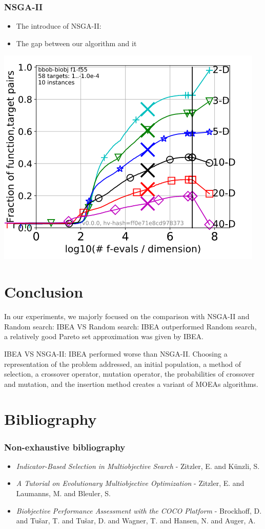 \documentclass{beamer}
\begin{document}
\begin{frame}
\frametitle{NSGA-II}
\begin{itemize}
\item The introduce of NSGA-II:
\item The gap between our algorithm and it
\end{itemize}
\centering \includegraphics[scale=0.35]{NSGA.png}

\end{frame}

\section{Conclusion}
\begin{frame}
In our experiments, we majorly focused on the
comparison with NSGA-II and Random search:
\vskip 0.1in
IBEA VS Random search: IBEA outperformed Random search, a relatively good Pareto set approximation was given by IBEA.
 
IBEA VS NSGA-II: IBEA performed worse than NSGA-II.
\vskip 0.1in
Choosing a representation of the problem
addressed, an initial population, a method of selection, a crossover operator,
mutation operator, the probabilities of crossover and mutation, and the
insertion method creates a variant of MOEAs algorithms. 
\end{frame}

\section{Bibliography}
\begin{frame}
\frametitle{Non-exhaustive bibliography}
\begin{itemize}
\item \textit{Indicator-Based Selection in Multiobjective Search} - Zitzler, E. and Künzli, S.
\item \textit{A Tutorial on Evolutionary Multiobjective Optimization} - Zitzler, E. and Laumanns, M. and Bleuler, S.
\item \textit{Biobjective Performance Assessment with the {COCO} Platform} - Brockhoff, D. and Tu{\v s}ar, T. and Tu{\v s}ar, D. and Wagner, T. and Hansen, N. and Auger, A.
\end{itemize}
\end{frame}
\end{document}
